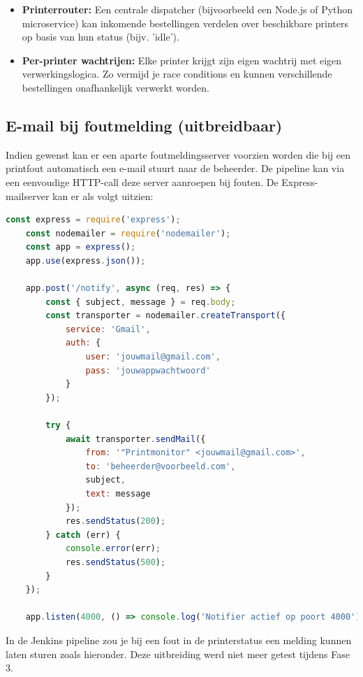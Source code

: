 \begin{enumerate}
\begin{itemize}
    \item \textbf{Printerrouter:} Een centrale dispatcher (bijvoorbeeld een Node.js of Python microservice) kan inkomende bestellingen verdelen over beschikbare printers op basis van hun status (bijv. 'idle').
    
    \item \textbf{Per-printer wachtrijen:} Elke printer krijgt zijn eigen wachtrij met eigen verwerkingslogica. Zo vermijd je race conditions en kunnen verschillende bestellingen onafhankelijk verwerkt worden.
\end{itemize}


\subsection{E-mail bij foutmelding (uitbreidbaar)}
Indien gewenst kan er een aparte foutmeldingsserver voorzien worden die bij een printfout automatisch een e-mail stuurt naar de beheerder. De pipeline kan via een eenvoudige HTTP-call deze server aanroepen bij fouten. De Express-mailserver kan er als volgt uitzien:

\begin{lstlisting}[language=javascript, caption=Express-server voor foutnotificatie per e-mail]
    const express = require('express');
    const nodemailer = require('nodemailer');
    const app = express();
    app.use(express.json());
    
    app.post('/notify', async (req, res) => {
        const { subject, message } = req.body;
        const transporter = nodemailer.createTransport({
            service: 'Gmail',
            auth: {
                user: 'jouwmail@gmail.com',
                pass: 'jouwappwachtwoord'
            }
        });
        
        try {
            await transporter.sendMail({
                from: '"Printmonitor" <jouwmail@gmail.com>',
                to: 'beheerder@voorbeeld.com',
                subject,
                text: message
            });
            res.sendStatus(200);
        } catch (err) {
            console.error(err);
            res.sendStatus(500);
        }
    });
    
    app.listen(4000, () => console.log('Notifier actief op poort 4000'));
\end{lstlisting}

In de Jenkins pipeline zou je bij een fout in de printerstatus een melding kunnen laten sturen zoals hieronder. Deze uitbreiding werd niet meer getest tijdens Fase 3.


\end{enumerate}
